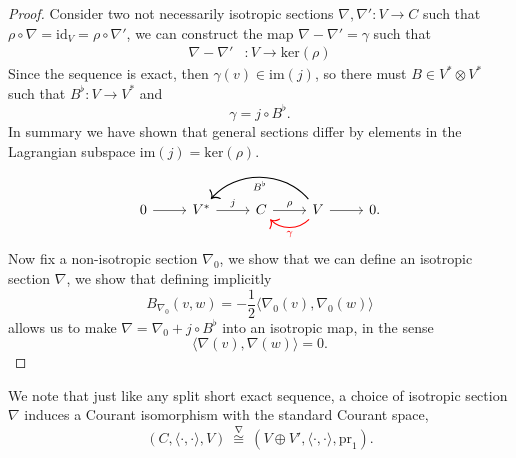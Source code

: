 % 
\begin{proof}
    Consider two not necessarily isotropic sections $\nabla, \nabla' : V \rightarrow C$ such that $\rho \circ \nabla = \mathrm{id}_V = \rho \circ \nabla'$, we can construct the map $\nabla - \nabla' = \gamma$ such that
    \begin{align*}
        \nabla - \nabla' &: V \rightarrow \mathrm{ker}(\rho)
    \end{align*} 
    Since the sequence is exact, then $\gamma(v) \in \mathrm{im}(j)$, so there must  $B \in V^* \otimes V^*$ such that $B^\flat : V \rightarrow V^*$ and
    \begin{equation}
        \gamma = j \circ B^\flat.
    \end{equation}
    In summary we have shown that general sections differ by elements in the Lagrangian subspace $\mathrm{im}(j) = \mathrm{ker}(\rho)$.
    \begin{equation*}
        \begin{tikzcd}
            0 \arrow[]{r}& V^* \arrow["j"]{r}& C \arrow["\rho"]{r}& V \arrow[]{r} \arrow[bend left = 45, color = red, "\gamma", thick]{l} \arrow[bend right = 50, "B^\flat", thick]{ll} & 0.
        \end{tikzcd}
    \end{equation*}
    Now fix a non-isotropic section $\nabla_0$, we show that we can define an isotropic section $\nabla$, we show that defining implicitly
    \begin{equation}
        B_{\nabla_0}(v,w) = -\frac{1}{2}\langle \nabla_0(v), \nabla_0(w) \rangle
    \end{equation}
    allows us to make $\nabla = \nabla_0 + j \circ B^\flat$ into an isotropic map, in the sense
    \begin{equation}
        \langle   \nabla(v), \nabla(w)\rangle = 0.
    \end{equation}
\end{proof}
% 
We note that just like any split short exact sequence, a choice of isotropic section $\nabla$ induces a Courant isomorphism with the standard Courant space,
\begin{equation}
    (C,\langle \cdot,\cdot \rangle, V) \:\overset{\nabla}{\cong} \:(V \oplus V', \langle \cdot,\cdot \rangle, \mathrm{pr}_1).
\end{equation}

